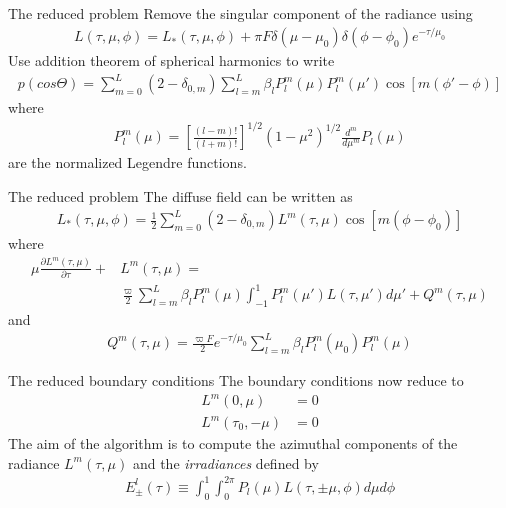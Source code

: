 \documentclass[14]{beamer}
\newcommand{\pfrac}[2]{\frac{\partial #1}{\partial #2}}
\begin{document}
\begin{frame}{The reduced problem}
  Remove the singular component of the radiance using
  \begin{align}
    L(\tau,\mu,\phi) = L_*(\tau,\mu,\phi) 
    + \pi F \delta(\mu-\mu_0) \delta(\phi-\phi_0) e^{-\tau/\mu_0}
  \end{align}
  Use addition theorem of spherical harmonics to write
  \begin{align}
    p(cos\Theta) = \sum_{m=0}^L(2-\delta_{0,m})
    \sum_{l=m}^L\beta_l P_l^m(\mu) P_l^m(\mu')
    \cos[m(\phi'-\phi)]
  \end{align}
  where
  \begin{align}
    P_l^m(\mu) = \left[
      \frac{(l-m)!}{(l+m)!}
      \right]^{1/2}
      (1-\mu^2)^{1/2}\frac{d^m}{d\mu^m}
      P_l(\mu)
  \end{align}
  are the normalized Legendre functions.
\end{frame}

\begin{frame}{The reduced problem}
  The diffuse field can be written as
  \begin{align}
    L_*(\tau,\mu,\phi) = \frac{1}{2} \sum_{m=0}^L
    (2-\delta_{0,m})L^m(\tau,\mu) \cos[m(\phi-\phi_0)]
  \end{align}
  where
  \begin{align}
    \mu\pfrac{L^m(\tau,\mu)}{\tau} + &L^m(\tau,\mu)
    = \\
    &\frac{\varpi}{2}
    \sum_{l=m}^L \beta_l P_l^m(\mu)
    \int_{-1}^1
    P_l^m(\mu') L(\tau,\mu') d\mu'
    + Q^m(\tau,\mu)
  \end{align}
  and 
  \begin{align}
    Q^m(\tau,\mu) = \frac{\varpi F}{2}e^{-\tau/\mu_0}
    \sum_{l=m}^L \beta_l P^m_l(\mu_0) P_l^m(\mu)
  \end{align}
\end{frame}

\begin{frame}{The reduced boundary conditions}
  The boundary conditions now reduce to
  \begin{align}
    L^m(0, \mu) &= 0 \\
    L^m(\tau_0, -\mu) &= 0
  \end{align}
  The aim of the algorithm is to compute the azimuthal components of
  the radiance $L^m(\tau,\mu)$ and the \emph{irradiances} defined by
  \begin{align}
    E_\pm^l(\tau) \equiv \int_0^1 \int_0^{2\pi}
    P_l(\mu) L(\tau,\pm \mu, \phi) d\mu d\phi
  \end{align}
\end{frame}
\end{document}

